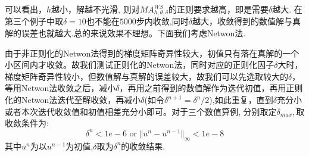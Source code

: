 \documentclass[11pt]{article}
\begin{document}
可以看出，$h$越小，解越不光滑, 则对$MA^{WS}_{h,\theta,\delta}$的正则要求越高，即是需要$\delta$越大. 在第三个例子中取$\delta=10$也不能在$5000$步内收敛,同时$\delta$越大，收敛得到的数值解与真解的误差也就越大.总的来说效果不理想。下面我们考虑Netwon法.



由于非正则化的Netwon法得到的梯度矩阵奇异性较大，初值只有落在真解的一个小区间内才收敛。故我们测试正则化的Netwon法，同时对应的正则化因子$\delta$大时，梯度矩阵奇异性较小，但数值解与真解的误差较大，故我们可以先选取较大的$\delta$，等用Netwon法收敛之后，减小$\delta$，再用之前得到的数值解作为迭代初值，再用正则化的Netwon法迭代至解收敛，再减小$\delta$(如令$\delta^{n+1}=\delta^{n}/2$),如此重复，直到$\delta$充分小或者本次迭代收敛值和初值相差充分小即可。对于三个数值算例, 分别取定$\delta_{max},$取收敛条件为:
$$\delta^{n}<1e-6\text{ or  }\Vert{u^{n}-u^{n-1}}\Vert_\infty{}<1e-8$$
其中$u^{n}$为以$u^{n-1}$为初值,$\delta$取为$\delta^n$的收敛结果.
\end{document}
